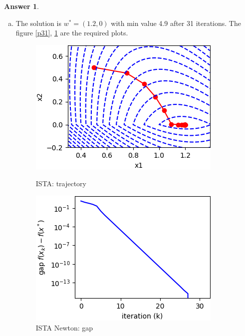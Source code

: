 \documentclass{article}
\theoremstyle{definition}
\newtheorem{ans}{Answer}
\begin{document}
	\begin{ans}
		~
		
		\begin{enumerate}[(a)]
			\item The solution is $w^*=(1.2, 0)$ with min value 4.9 after 31 iterations. The figure \ref{p31}, \ref{p32} are the required plots. 
			
			\begin{figure}[h]
				\begin{minipage}[t]{0.5\linewidth}
					\centering
					\includegraphics[width=0.9\linewidth]{../figures/4/ista_traces_lambda2}
					\caption{ISTA: trajectory}
					\label{p31}
				\end{minipage}
				\begin{minipage}[t]{0.5\linewidth}
					\centering
					\includegraphics[width=0.9\linewidth]{../figures/4/ista_gap_lambda2}
					\caption{ISTA Newton: gap}
					\label{p32}
				\end{minipage}		
			\end{figure}
			

\end{enumerate}
\end{ans}
\end{document}
